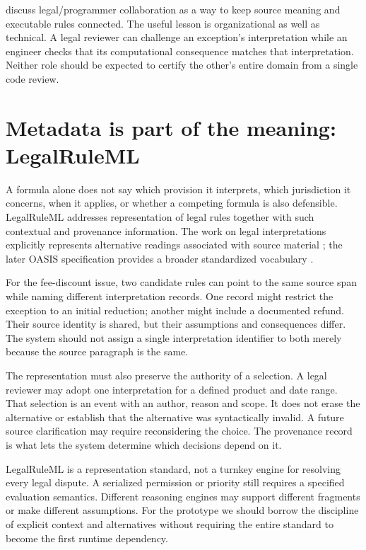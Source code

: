 \documentclass[12pt,a4paper,oneside,openany]{book}
\begin{document}
\citet[sec.~4.2]{huttner2022} discuss legal/programmer collaboration as a way
to keep source meaning and executable rules connected. The useful lesson is
organizational as well as technical. A legal reviewer can challenge an
exception's interpretation while an engineer checks that its computational
consequence matches that interpretation. Neither role should be expected to
certify the other's entire domain from a single code review.

\section{Metadata is part of the meaning: LegalRuleML}
\label{sec:languages-legalruleml}
A formula alone does not say which provision it interprets, which jurisdiction
it concerns, when it applies, or whether a competing formula is also
defensible. LegalRuleML addresses representation of legal rules together with
such contextual and provenance information. The work on legal interpretations
explicitly represents alternative readings associated with source material
\citep[secs.~2--4]{legalinterpretations2014}; the later OASIS specification
provides a broader standardized vocabulary \citep{legalruleml2021}.

For the fee-discount issue, two candidate rules can point to the same source
span while naming different interpretation records. One record might restrict
the exception to an initial reduction; another might include a documented
refund. Their source identity is shared, but their assumptions and consequences
differ. The system should not assign a single interpretation identifier to
both merely because the source paragraph is the same.

The representation must also preserve the authority of a selection. A legal
reviewer may adopt one interpretation for a defined product and date range.
That selection is an event with an author, reason and scope. It does not erase
the alternative or establish that the alternative was syntactically invalid.
A future source clarification may require reconsidering the choice. The
provenance record is what lets the system determine which decisions depend on it.

LegalRuleML is a representation standard, not a turnkey engine for resolving
every legal dispute. A serialized permission or priority still requires a
specified evaluation semantics. Different reasoning engines may support
different fragments or make different assumptions. For the prototype we should
borrow the discipline of explicit context and alternatives without requiring
the entire standard to become the first runtime dependency.
\end{document}
